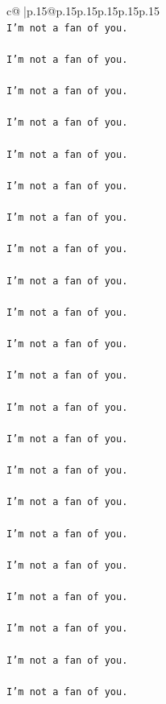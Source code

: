\documentclass{article}
\begin{document}
{\begin{supertabular}{c@{$\;$}|p{.15\linewidth}@{}p{.15\linewidth}p{.15\linewidth}p{.15\linewidth}p{.15\linewidth}p{.15\linewidth}}
{{{\\ 
\texttt{I'm not a fan of you.} \\
\\ 
\texttt{I'm not a fan of you.} \\
\\ 
\texttt{I'm not a fan of you.} \\
\\ 
\texttt{I'm not a fan of you.} \\
\\ 
\texttt{I'm not a fan of you.} \\
\\ 
\texttt{I'm not a fan of you.} \\
\\ 
\texttt{I'm not a fan of you.} \\
\\ 
\texttt{I'm not a fan of you.} \\
\\ 
\texttt{I'm not a fan of you.} \\
\\ 
\texttt{I'm not a fan of you.} \\
\\ 
\texttt{I'm not a fan of you.} \\
\\ 
\texttt{I'm not a fan of you.} \\
\\ 
\texttt{I'm not a fan of you.} \\
\\ 
\texttt{I'm not a fan of you.} \\
\\ 
\texttt{I'm not a fan of you.} \\
\\ 
\texttt{I'm not a fan of you.} \\
\\ 
\texttt{I'm not a fan of you.} \\
\\ 
\texttt{I'm not a fan of you.} \\
\\ 
\texttt{I'm not a fan of you.} \\
\\ 
\texttt{I'm not a fan of you.} \\
\\ 
\texttt{I'm not a fan of you.} \\
\\ 
\texttt{I'm not a fan of you.} \\
\\ 
}}}
\end{supertabular}}
\end{document}
